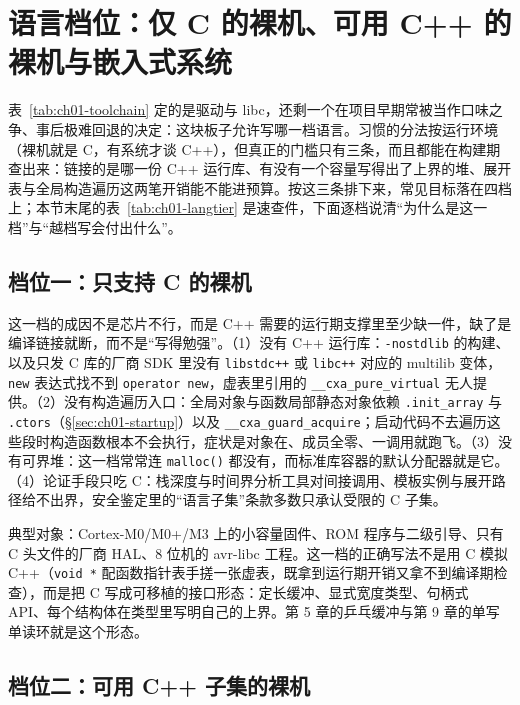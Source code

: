 \documentclass[12pt,a4paper,fontset=fandol]{ctexbook}
\newcommand{\Fn}[1]{\texttt{#1()}}
\newcommand{\Tp}[1]{\texttt{#1}}
\newcommand{\Bk}{\discretionary{}{}{}}
\newcommand{\Lang}[1]{\textsf{#1}}
\newcommand{\CL}{\Lang{C}}
\newcommand{\CPP}{\Lang{C++}}
\begin{document}
\section{语言档位：仅 \CL{} 的裸机、可用 \CPP{} 的裸机与嵌入式系统}

\label{sec:ch01-langtier}

表~\ref{tab:ch01-toolchain} 定的是驱动与 libc，还剩一个在项目早期常被当作口味之争、事后极难回退的决定：这块板子允许写哪一档语言。习惯的分法按运行环境（裸机就是 \CL{}，有系统才谈 \CPP{}），但真正的门槛只有三条，而且都能在构建期查出来：链接的是哪一份 \CPP{} 运行库、有没有一个容量写得出了上界的堆、展开表与全局构造遍历这两笔开销能不能进预算。按这三条排下来，常见目标落在四档上；本节末尾的表~\ref{tab:ch01-langtier} 是速查件，下面逐档说清``为什么是这一档''与``越档写会付出什么''。

\subsection{档位一：只支持 \CL{} 的裸机}

这一档的成因不是芯片不行，而是 \CPP{} 需要的运行期支撑里至少缺一件，缺了是编译链接就断，而不是``写得勉强''。（1）没有 \CPP{} 运行库：\Tp{-nostdlib} 的构建、以及只发 C 库的厂商 SDK 里没有 \Tp{libstdc++} 或 \Tp{libc++} 对应的 multilib 变体，\Tp{new} 表达式找不到 \Tp{operator new}，虚表里引用的 \Tp{\_\_cxa{\Bk}\_pure{\Bk}\_virtual} 无人提供。（2）没有构造遍历入口：全局对象与函数局部静态对象依赖 \Tp{.init\_array} 与 \Tp{.ctors}（\S\ref{sec:ch01-startup}）以及 \Tp{\_\_cxa{\Bk}\_guard{\Bk}\_acquire}；启动代码不去遍历这些段时构造函数根本不会执行，症状是对象在、成员全零、一调用就跑飞。（3）没有可界堆：这一档常常连 \Fn{malloc} 都没有，而标准库容器的默认分配器就是它。（4）论证手段只吃 \CL{}：栈深度与时间界分析工具对间接调用、模板实例与展开路径给不出界，安全鉴定里的``语言子集''条款多数只承认受限的 \CL{} 子集。

典型对象：Cortex-M0/M0+/M3 上的小容量固件、ROM 程序与二级引导、只有 C 头文件的厂商 HAL、8 位机的 avr-libc 工程。这一档的正确写法不是用 \CL{} 模拟 \CPP{}（\Tp{void *} 配函数指针表手搓一张虚表，既拿到运行期开销又拿不到编译期检查），而是把 C 写成可移植的接口形态：定长缓冲、显式宽度类型、句柄式 API、每个结构体在类型里写明自己的上界。第 5 章的乒乓缓冲与第 9 章的单写单读环就是这个形态。

\subsection{档位二：可用 \CPP{} 子集的裸机}
\end{document}
